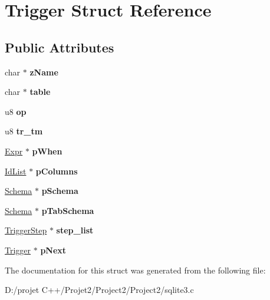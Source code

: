 \hypertarget{struct_trigger}{}\section{Trigger Struct Reference}
\label{struct_trigger}
\subsection*{Public Attributes}
\begin{DoxyCompactItemize}
\item 
\mbox{\label{struct_trigger_a9aecea5dadd7ae93b7f585c4b914791c}} 
char $\ast$ {\bfseries z\+Name}
\item 
\mbox{\label{struct_trigger_ab9d5500f7fc43382e867733a2968ecae}} 
char $\ast$ {\bfseries table}
\item 
\mbox{\label{struct_trigger_a855d6b6a302d8d80e1d30ddd70fd403e}} 
u8 {\bfseries op}
\item 
\mbox{\label{struct_trigger_af0d10da140b068bfd76aaeb6607fa6cf}} 
u8 {\bfseries tr\+\_\+tm}
\item 
\mbox{\label{struct_trigger_a1b6cdd46e8b98562920d1acee86281ed}} 
\mbox{\hyperlink{struct_expr}{Expr}} $\ast$ {\bfseries p\+When}
\item 
\mbox{\label{struct_trigger_a8505fbdf63ca9eadf4b2585e99faa4e4}} 
\mbox{\hyperlink{struct_id_list}{Id\+List}} $\ast$ {\bfseries p\+Columns}
\item 
\mbox{\label{struct_trigger_a83edbfa91ce6520a6ebc1a21acc2cd5e}} 
\mbox{\hyperlink{struct_schema}{Schema}} $\ast$ {\bfseries p\+Schema}
\item 
\mbox{\label{struct_trigger_a8e4a9b3f4bcc5c645e1777b3bb94a6d8}} 
\mbox{\hyperlink{struct_schema}{Schema}} $\ast$ {\bfseries p\+Tab\+Schema}
\item 
\mbox{\label{struct_trigger_a4206faaae6cdf1a2b22a2c9f15c88642}} 
\mbox{\hyperlink{struct_trigger_step}{Trigger\+Step}} $\ast$ {\bfseries step\+\_\+list}
\item 
\mbox{\label{struct_trigger_ac28107e1c45789e0146fe45867b8dfdb}} 
\mbox{\hyperlink{struct_trigger}{Trigger}} $\ast$ {\bfseries p\+Next}
\end{DoxyCompactItemize}


The documentation for this struct was generated from the following file\+:\begin{DoxyCompactItemize}
\item 
D\+:/projet C++/\+Projet2/\+Project2/\+Project2/sqlite3.\+c\end{DoxyCompactItemize}
